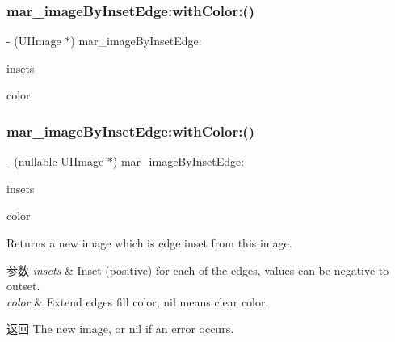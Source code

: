 \subsubsection{\texorpdfstring{mar\+\_\+image\+By\+Inset\+Edge\+:with\+Color\+:()}{mar\_imageByInsetEdge:withColor:()}\hspace{0.1cm}{\footnotesize\ttfamily [1/2]}}
{\footnotesize\ttfamily -\/ (U\+I\+Image $\ast$) mar\+\_\+image\+By\+Inset\+Edge\+: \begin{DoxyParamCaption}\item[{(U\+I\+Edge\+Insets)}]{insets }\item[{withColor:(U\+I\+Color $\ast$)}]{color }\end{DoxyParamCaption}\hspace{0.3cm}{\ttfamily [implementation]}}

\mbox{\label{category_u_i_image_07_m_a_r_e_x_08_ae6cd33f2aae5e492cf8ff18ceea8b4bd}} 
\subsubsection{\texorpdfstring{mar\+\_\+image\+By\+Inset\+Edge\+:with\+Color\+:()}{mar\_imageByInsetEdge:withColor:()}\hspace{0.1cm}{\footnotesize\ttfamily [2/2]}}
{\footnotesize\ttfamily -\/ (nullable U\+I\+Image $\ast$) mar\+\_\+image\+By\+Inset\+Edge\+: \begin{DoxyParamCaption}\item[{(U\+I\+Edge\+Insets)}]{insets }\item[{withColor:(nullable U\+I\+Color $\ast$)}]{color }\end{DoxyParamCaption}}

Returns a new image which is edge inset from this image.


\begin{DoxyParams}{参数}
{\em insets} & Inset (positive) for each of the edges, values can be negative to \textquotesingle{}outset\textquotesingle{}.\\
\hline
{\em color} & Extend edge\textquotesingle{}s fill color, nil means clear color.\\
\hline
\end{DoxyParams}
\begin{DoxyReturn}{返回}
The new image, or nil if an error occurs. 
\end{DoxyReturn}
\mbox{\label{category_u_i_image_07_m_a_r_e_x_08_af12a9f699153eb6a42a876a72967db3b}} 
